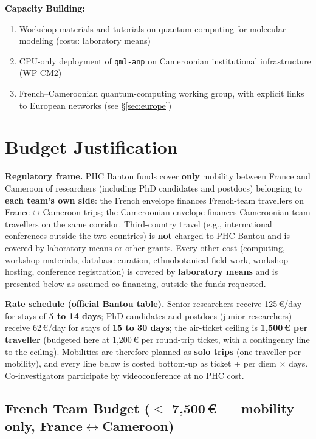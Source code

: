 \documentclass[11pt,a4paper]{article}
\begin{document}
\textbf{Capacity Building:}
\begin{enumerate}
    \item Workshop materials and tutorials on quantum computing for molecular modeling (costs: laboratory means)
    \item CPU-only deployment of \texttt{qml-anp} on Cameroonian institutional infrastructure (WP-CM2)
    \item French--Cameroonian quantum-computing working group, with explicit links to European networks (see \S\ref{sec:europe})
\end{enumerate}

\section{Budget Justification}
\label{sec:budget}

\textbf{Regulatory frame.} PHC Bantou funds cover \textbf{only} mobility between France and Cameroon of researchers (including PhD candidates and postdocs) belonging to \textbf{each team's own side}: the French envelope finances French-team travellers on France$\leftrightarrow$Cameroon trips; the Cameroonian envelope finances Cameroonian-team travellers on the same corridor. Third-country travel (e.g., international conferences outside the two countries) is \textbf{not} charged to PHC Bantou and is covered by laboratory means or other grants. Every other cost (computing, workshop materials, database curation, ethnobotanical field work, workshop hosting, conference registration) is covered by \textbf{laboratory means} and is presented below as assumed co-financing, outside the funds requested.

\textbf{Rate schedule (official Bantou table).} Senior researchers receive 125\,€/day for stays of \textbf{5 to 14 days}; PhD candidates and postdocs (junior researchers) receive 62\,€/day for stays of \textbf{15 to 30 days}; the air-ticket ceiling is \textbf{1,500\,€ per traveller} (budgeted here at 1,200\,€ per round-trip ticket, with a contingency line to the ceiling). Mobilities are therefore planned as \textbf{solo trips} (one traveller per mobility), and every line below is costed bottom-up as ticket + per diem $\times$ days. Co-investigators participate by videoconference at no PHC cost.

\subsection{French Team Budget ($\leq$ 7,500\,€ --- mobility only, France$\leftrightarrow$Cameroon)}
\end{document}
